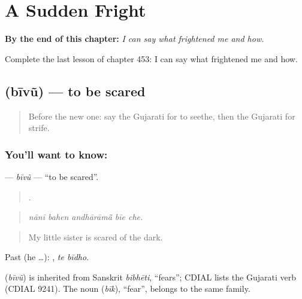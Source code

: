 
\chapter{A Sudden Fright}
\label{ch:gu-a-sudden-fright}

\begin{chapteropening}
\textbf{By the end of this chapter:} \emph{I can say what frightened me and how.}

Complete the last lesson of chapter 453: I can say what frightened me and how.
\end{chapteropening}

\section[\texorpdfstring{\gu{બીવું} (bīvũ)}{બીવું (bīvũ)}]{ (bīvũ) — to be scared}

\label{lesson:GU-C453-bivu}



\begin{quote}
Before the new one: say the Gujarati for to seethe, then the Gujarati for strife.
\end{quote}

\subsection*{You'll want to know: }
\textbf{} — \emph{bīvũ} — \textquotedblleft{}to be scared\textquotedblright{}.

\begin{quote}
    .
\end{quote}

\begin{quote}
\emph{nānī bahen andhārāmā̃ bīe che.}
\end{quote}

\begin{quote}
My little sister is scared of the dark.
\end{quote}

Past (he …):  , \emph{te bīdho}.

\begin{cousinweb}
\textbf{} (\emph{bīvũ}) is inherited from Sanskrit \emph{bibhēti}, \textquotedblleft{}fears\textquotedblright{}; CDIAL lists the Gujarati verb (CDIAL 9241). The noun \textbf{} (\emph{bīk}), \textquotedblleft{}fear\textquotedblright{}, belongs to the same family.
\end{cousinweb}

